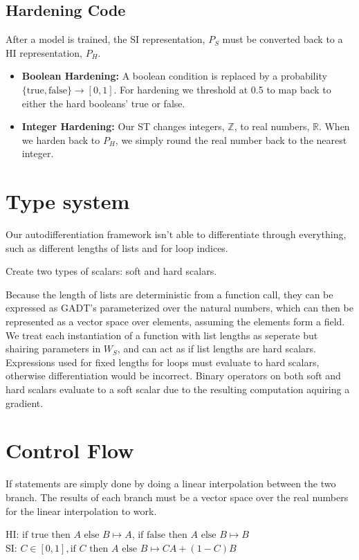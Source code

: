 \documentclass{article}
\begin{document}
\subsection{Hardening Code}
After a model is trained, the SI representation, $P_S$ must be converted back to a HI representation, $P_H$.
\begin{itemize}
    \item \textbf{Boolean Hardening:} A boolean condition is replaced by a probability $\{\text{true}, \text{false} \} \longrightarrow [0, 1]$. For hardening we threshold at 0.5 to map back to either the hard booleans' true or false.
    \item \textbf{Integer Hardening:} Our ST changes integers, $\mathbb{Z}$, to real numbers, $\mathbb{R}$. When we harden back to $P_H$, we simply round the real number back to the nearest integer.
\end{itemize}

\section*{Type system}
Our autodifferentiation framework isn't able to differentiate through everything, such as different lengths of lists and for loop indices.

Create two types of scalars: soft and hard scalars.

Because the length of lists are deterministic from a function call, they can be expressed as GADT's parameterized over the natural numbers, which can then be represented as a vector space over elements, assuming the elements form a field. We treat each instantiation of a function with list lengths as seperate but shairing parameters in $W_S$, and can act as if list lengths are hard scalars. Expressions used for fixed lengths for loops must evaluate to hard scalars, otherwise differentiation would be incorrect. Binary operators on both soft and hard scalars evaluate to a soft scalar due to the resulting computation aquiring a gradient.
\section{Control Flow}
If statements are simply done by doing a linear interpolation between the two branch. The results of each branch must be a vector space over the real numbers for the linear interpolation to work.

\begin{center}
  HI: $\text{if } \text{true} \text{ then } A \text{ else } B \mapsto A$, $\text{if } \text{false} \text{ then } A \text{ else } B \mapsto B$\\
  SI: $C \in [0, 1], \text{if } C \text{ then } A \text{ else } B \mapsto CA + (1-C)B$
\end{center}
\end{document}
